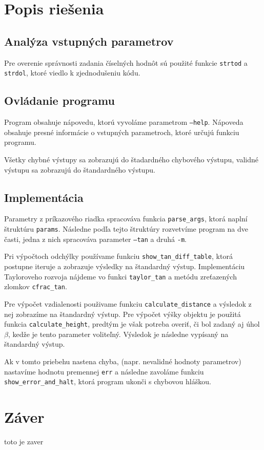 \documentclass[12pt,a4paper,titlepage,final]{report}
\begin{document}
\chapter{Popis riešenia}

\section{Analýza vstupných parametrov}
Pre overenie správnosti zadania číselných hodnôt sú použité funkcie \texttt{strtod} a \texttt{strdol}, ktoré viedlo k zjednodušeniu kódu.

\section{Ovládanie programu}
Program obsahuje nápovedu, ktorú vyvoláme parametrom \texttt{--help}. Nápoveda obsahuje presné informácie o vstupných parametroch, ktoré určujú funkciu programu.

Všetky chybné výstupy sa zobrazujú do štadardného chybového výstupu, validné výstupu sa zobrazujú do štandardného výstupu.

\section{Implementácia}
Parametry z príkazového riadka spracováva funkcia \texttt{parse\_args}, ktorá naplní štruktúru \texttt{params}. Následne podľa tejto štruktúry rozvetvíme program na dve časti, jedna z nich spracováva parameter \texttt{--tan} a druhá \texttt{-m}.

Pri výpočtoch odchýlky používame funkciu \texttt{show\_tan\_diff\_table}, ktorá postupne iteruje a zobrazuje výsledky na štandardný výstup. Implementáciu Tayloroveho rozvoja nájdeme vo funkci \texttt{taylor\_tan} a metódu zreťazených zlomkov \texttt{cfrac\_tan}.

Pre výpočet vzdialenosti použivame funkciu \texttt{calculate\_distance} a výsledok z nej zobrazíme na štandardný výstup. Pre výpočet výšky objektu je použitá funkcia \texttt{calculate\_height}, predtým je však potreba overiť, či bol zadaný aj úhol $\beta$, kedže je tento parameter voliteľný. Výsledok je následne vypísaný na štandardný výstup.

Ak v tomto priebehu nastena chyba, (napr. nevalidné hodnoty parametrov) nastavíme hodnotu premennej \texttt{err} a následne zavoláme funkciu \texttt{show\_error\_and\_halt}, ktorá program ukonči s chybovou hláškou.

\chapter{Záver}
toto je zaver
\end{document}
